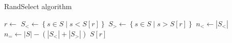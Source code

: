 %
\begin{algorithm}[t]
\caption{RandSelect algorithm}\label{alg:randselect}
\begin{algorithmic}[1]
  \State $r \gets $ 
  \State $S_< \gets \left\{ s \in S \mid s < S[r] \right\}$
  \State $S_> \gets \left\{ s \in S \mid s > S[r] \right\}$
  \State $n_< \gets |S_<|$
  \State $n_= \gets |S| - (|S_<| + |S_>|)$
    \State \Return {}
    \State \Return $S[r]$
  \Else
    \State \Return {}
  \EndIf
\EndFunction
\end{algorithmic}
\end{algorithm}
